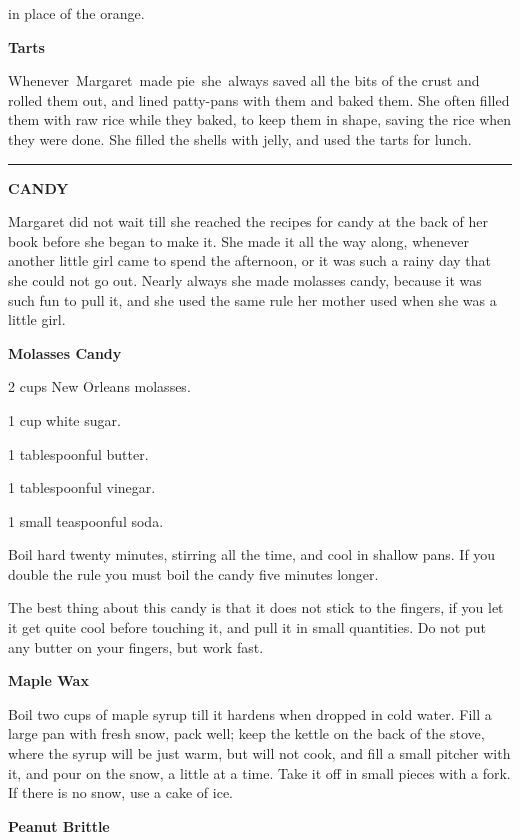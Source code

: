 \documentclass[11pt]{book}
\newcommand{\hstroke}{\rule[0.5ex]{5.0em}{0.2ex}}
\newcommand{\indpar}{\par\noindent\hspace*{\parindent}}
\newcommand{\ingredient}{\indpar}
\newcommand{\instruction}{\indpar}
\newenvironment{RecipeTitle}{\medskip\begin{center}\large\bf }{\end{center}\smallskip}
\newenvironment{FoodTypeTitle}{\begin{center}\large\bf }{\end{center}}
\begin{document}
in place of the orange.
\begin{RecipeTitle}
Tarts\label{tarts}
\end{RecipeTitle}
\instruction  Whenever\, Margaret\, made pie\, she\, always saved all the bits of
the crust and rolled them out, and lined patty-pans with them
and baked them.  She often filled them with raw rice while
they baked, to keep them in shape, saving the rice when they
were done.  She filled the shells with jelly, and used the
tarts for lunch.
\medskip
\begin{center}
\hstroke
\end{center}
\begin{FoodTypeTitle}
CANDY\label{CANDY}
\end{FoodTypeTitle}
\smallskip
\indpar
Margaret did not wait till she reached the recipes for candy
at the back of her book before she began to make it.  She made
it all the way along, whenever another little girl came to
spend the afternoon, or it was such a rainy day that she could
not go out.  Nearly always she made molasses candy, because it
was such fun to pull it, and she used the same rule her mother
used when she was a little girl.
\begin{RecipeTitle}
Molasses Candy\label{molasses_candy}
\end{RecipeTitle}
\ingredient  2 cups New Orleans molasses.
\ingredient  1 cup white sugar.
\ingredient  1 tablespoonful butter.
\ingredient  1 tablespoonful vinegar.
\ingredient  1 small teaspoonful soda.
\instruction  Boil hard twenty minutes, stirring all the time, and cool in
shallow pans.  If you double the rule you must boil the candy
five minutes longer.
\instruction  The best thing about this candy is that it does not stick to
the fingers, if you let it get quite cool before touching it,
and pull it in small quantities.  Do not put any butter on
your fingers, but work fast.
\begin{RecipeTitle}
Maple Wax\label{maple_wax}
\end{RecipeTitle}
\instruction  Boil two cups of maple syrup till it hardens when dropped in
cold water.  Fill a large pan with fresh snow, pack well; keep
the kettle on the back of the stove, where the syrup will be
just warm, but will not cook, and fill a small pitcher with
it, and pour on the snow, a little at a time.  Take it off in
small pieces with a fork.  If there is no snow, use a cake of
ice.
\begin{RecipeTitle}
Peanut Brittle\label{peanut_brittle}
\end{RecipeTitle}
\end{document}
